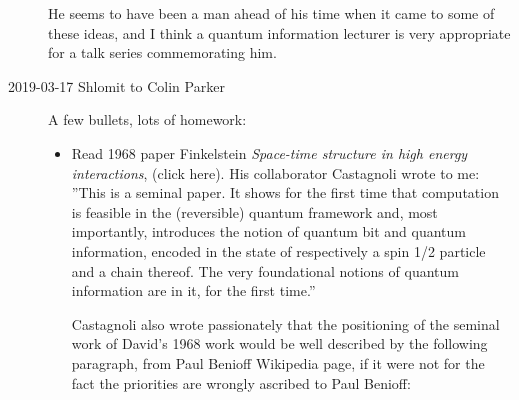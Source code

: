 \begin{description}
He seems to have been a man ahead of his time when it came to some of
these ideas, and I think a quantum information lecturer is very
appropriate for a talk series commemorating him.

\item[2019-03-17 Shlomit to Colin Parker]
A few bullets, lots of homework:
\begin{itemize}
  \item
Read
1968 paper
Finkelstein {\em Space-time structure in high energy interactions},
{(click here)}. His collaborator Castagnoli wrote to me:
''This is a seminal paper. It shows for the first
time that computation is feasible in the (reversible) quantum framework
and, most importantly, introduces the notion of quantum bit and quantum
information, encoded in the state of respectively a spin 1/2 particle and
a chain thereof. The very foundational notions of quantum information are
in it, for the first time.''

Castagnoli also wrote passionately that the positioning of
the seminal work of David's 1968 work would be well described by the
following paragraph, from Paul Benioff
 {Wikipedia page}, if it
were not for the fact the priorities are wrongly ascribed to Paul
Benioff:


\end{itemize}
\end{description}
